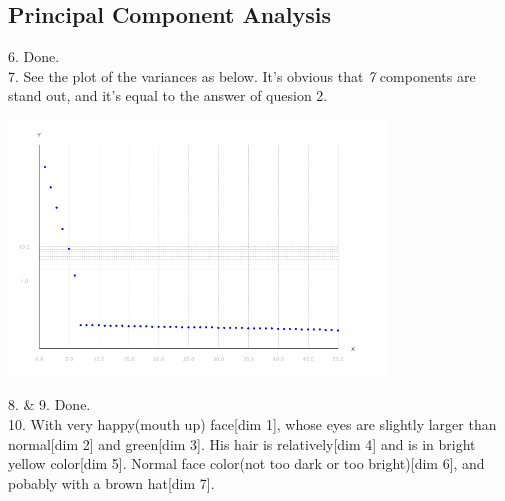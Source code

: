 \documentclass[11pt]{article} %
\begin{document}
\subsection{Principal Component Analysis}
6. Done.\\
7. See the plot of the variances as below. It's obvious that \emph{7} components are stand out, and it's equal to the answer of quesion 2.\\
\centerline{
\includegraphics[width=10cm]{pic/p3}}
8. \& 9. Done. \\
10. With very happy(mouth up) face[dim 1], whose eyes are slightly larger than normal[dim 2] and green[dim 3]. His hair is relatively[dim 4] and is in bright yellow color[dim 5]. Normal face color(not too dark or too bright)[dim 6], and pobably with a brown hat[dim 7].\\
\end{document}

